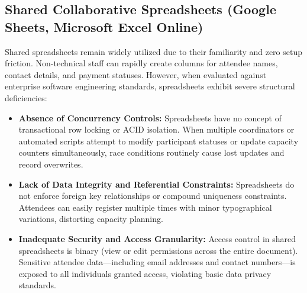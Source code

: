 \documentclass[11pt,a4paper]{report}
\begin{document}
\subsection{Shared Collaborative Spreadsheets (Google Sheets, Microsoft Excel Online)}
Shared spreadsheets remain widely utilized due to their familiarity and zero setup friction. Non-technical staff can rapidly create columns for attendee names, contact details, and payment statuses. However, when evaluated against enterprise software engineering standards, spreadsheets exhibit severe structural deficiencies:
\begin{itemize}[leftmargin=1.5em, itemsep=0.4em]
    \item \textbf{Absence of Concurrency Controls:} Spreadsheets have no concept of transactional row locking or ACID isolation. When multiple coordinators or automated scripts attempt to modify participant statuses or update capacity counters simultaneously, race conditions routinely cause lost updates and record overwrites.
    \item \textbf{Lack of Data Integrity and Referential Constraints:} Spreadsheets do not enforce foreign key relationships or compound uniqueness constraints. Attendees can easily register multiple times with minor typographical variations, distorting capacity planning.
    \item \textbf{Inadequate Security and Access Granularity:} Access control in shared spreadsheets is binary (view or edit permissions across the entire document). Sensitive attendee data---including email addresses and contact numbers---is exposed to all individuals granted access, violating basic data privacy standards.
\end{itemize}
\end{document}
